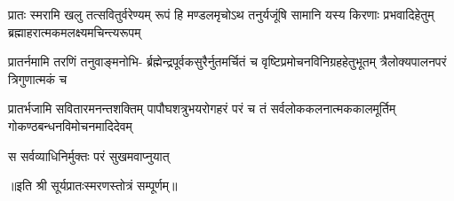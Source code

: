 

\fourlineindentedshloka
{प्रातः स्मरामि खलु तत्सवितुर्वरेण्यम् }
{रूपं हि मण्डलमृचोऽथ तनुर्यजूंषि}
{सामानि यस्य किरणाः प्रभवादिहेतुम्}
{ब्रह्माहरात्मकमलक्ष्यमचिन्त्यरूपम्}

\fourlineindentedshloka
{प्रातर्नमामि तरणिं तनुवाङ्मनोभि-}
{र्ब्रह्मेन्द्रपूर्वकसुरैर्नुतमर्चितं च}
{वृष्टिप्रमोचनविनिग्रहहेतुभूतम्}
{त्रैलोक्यपालनपरं त्रिगुणात्मकं च}

\fourlineindentedshloka
{प्रातर्भजामि सवितारमनन्तशक्तिम्}
{पापौघशत्रुभयरोगहरं परं च}
{तं सर्वलोककलनात्मककालमूर्तिम्}
{गोकण्ठबन्धनविमोचनमादिदेवम्}

{स सर्वव्याधिनिर्मुक्तः परं सुखमवाप्नुयात्}

॥इति श्री सूर्यप्रातःस्मरणस्तोत्रं सम्पूर्णम्॥